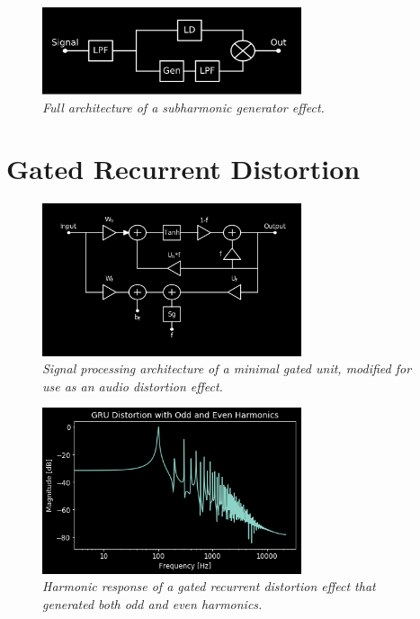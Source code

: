 \documentclass[twoside,a4paper]{article}
\begin{document}
%
\begin{figure}[h]
    \center
    \includegraphics[width=3in]{../Subharmonics/Pics/full_arch.png}
    \caption{\label{sub_arch}{\it Full architecture of a subharmonic generator effect.}}
\end{figure}
%
\section{Gated Recurrent Distortion} \label{sec:GRU}
%
\begin{figure}[h]
    \center
    \includegraphics[width=3in]{../GatedRecurrentDistortion/Pics/gru_arch.png}
    \caption{\label{gru-arch}{\it Signal processing architecture of a minimal
    gated unit, modified for use as an audio distortion effect.}}
\end{figure}
%
\begin{figure}[h]
    \center
    \includegraphics[width=3in]{../GatedRecurrentDistortion/Pics/all_harm.png}
    \caption{\label{gru-harm}{\it Harmonic response of a gated recurrent distortion
    effect that generated both odd and even harmonics.}}
\end{figure}
%
\end{document}
